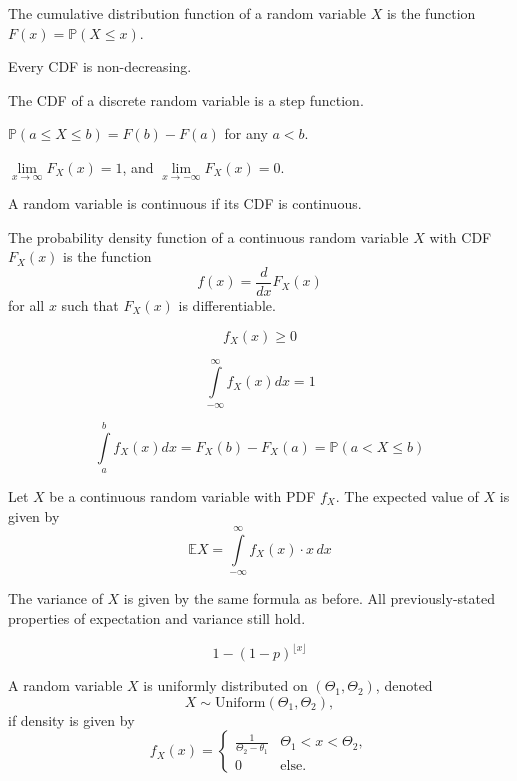 \documentclass{article}
\begin{document}
\medskip
{}

    The cumulative distribution function of a random variable $X$ is the function $F(x) = \mathbb P(X \leq x)$.
    
    Every CDF is non-decreasing.
    
    The CDF of a discrete random variable is a step function.
    
    $\mathbb P(a \leq X \leq b) = F(b) - F(a)$ for any $a < b$.
    
    $\lim\limits_{x\to\infty} F_X(x) = 1$, and $\lim\limits_{x\to-\infty} F_X(x) = 0$.
    
\medskip
{}

    A random variable is continuous if its CDF is continuous.
    
\medskip
{}

    The probability density function of a continuous random variable $X$ with CDF $F_X(x)$ is the function $$f(x) = \frac{d}{dx} F_X(x)$$ for all $x$ such that $F_X(x)$ is differentiable.
    
    $$f_X(x) \geq 0$$
    
    $$\int\limits_{-\infty}^\infty f_X(x)dx = 1$$
    
    $$\int\limits_a^bf_X(x)dx = F_X(b) - F_X(a) = \mathbb P(a < X \leq b)$$
    
\medskip
{}

    Let $X$ be a continuous random variable with PDF $f_X$. The expected value of $X$ is given by 
    $$\mathbb EX = \int\limits_{-\infty}^\infty f_X(x) \cdot x\,dx$$
    
    The variance of $X$ is given by the same formula as before. All previously-stated properties of expectation and variance still hold.
    
\medskip
{}

    $$1 - (1-p)^{\lfloor x \rfloor}$$
    
\medskip
{}

    A random variable $X$ is uniformly distributed on $(\Theta_1, \Theta_2)$, denoted $$X \sim \text{Uniform}(\Theta_1, \Theta_2),$$ if density is given by $$f_X(x) = \begin{cases} \frac1{\Theta_2 - \theta_1} & \Theta_1 < x < \Theta_2, \\ 0 & \text{else.} \end{cases}$$
    
\end{document}

